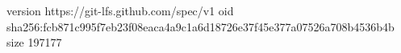 version https://git-lfs.github.com/spec/v1
oid sha256:fcb871c995f7eb23f08eaca4a9c1a6d18726e37f45e377a07526a708b4536b4b
size 197177
